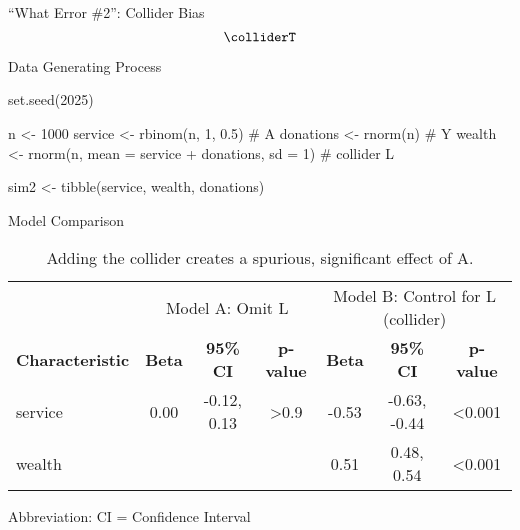 \documentclass[
  ignorenonframetext,
  aspectratio=169,
  xcolor=\{dvipsnames\}]{beamer}
\newenvironment{Shaded}{\begin{snugshade}}{\end{snugshade}}
\newcommand{\AttributeTok}[1]{\textcolor[rgb]{0.40,0.45,0.13}{#1}}
\newcommand{\CommentTok}[1]{\textcolor[rgb]{0.37,0.37,0.37}{#1}}
\newcommand{\DecValTok}[1]{\textcolor[rgb]{0.68,0.00,0.00}{#1}}
\newcommand{\FloatTok}[1]{\textcolor[rgb]{0.68,0.00,0.00}{#1}}
\newcommand{\FunctionTok}[1]{\textcolor[rgb]{0.28,0.35,0.67}{#1}}
\newcommand{\NormalTok}[1]{\textcolor[rgb]{0.00,0.23,0.31}{#1}}
\newcommand{\OtherTok}[1]{\textcolor[rgb]{0.00,0.23,0.31}{#1}}
\newcommand{\SpecialCharTok}[1]{\textcolor[rgb]{0.37,0.37,0.37}{#1}}
\begin{document}
\begin{frame}{``What Error \#2'': Collider Bias}
\label{what-error-2-collider-bias}
\[\colliderT\]
\end{frame}

\begin{frame}[fragile]{Data Generating Process}
\label{data-generating-process-1}
\begin{Shaded}
\begin{Highlighting}[]
\FunctionTok{set.seed}\NormalTok{(}\DecValTok{2025}\NormalTok{)}

\NormalTok{n          }\OtherTok{\textless{}{-}} \DecValTok{1000}
\NormalTok{service    }\OtherTok{\textless{}{-}} \FunctionTok{rbinom}\NormalTok{(n, }\DecValTok{1}\NormalTok{, }\FloatTok{0.5}\NormalTok{)                            }\CommentTok{\# A}
\NormalTok{donations  }\OtherTok{\textless{}{-}} \FunctionTok{rnorm}\NormalTok{(n)                                     }\CommentTok{\# Y}
\NormalTok{wealth     }\OtherTok{\textless{}{-}} \FunctionTok{rnorm}\NormalTok{(n, }\AttributeTok{mean =}\NormalTok{ service }\SpecialCharTok{+}\NormalTok{ donations, }\AttributeTok{sd =} \DecValTok{1}\NormalTok{) }\CommentTok{\# collider L}

\NormalTok{sim2 }\OtherTok{\textless{}{-}} \FunctionTok{tibble}\NormalTok{(service, wealth, donations)}
\end{Highlighting}
\end{Shaded}
\end{frame}

\begin{frame}{Model Comparison}
\label{model-comparison-1}
\begin{table}
\caption{Adding the collider creates a spurious, significant effect of A.}\tabularnewline

\fontsize{12.0pt}{14.4pt}\selectfont
\begin{tabular*}{\linewidth}{@{\extracolsep{\fill}}lcccccc}
\toprule
 & \multicolumn{3}{c}{Model A: Omit L} & \multicolumn{3}{c}{Model B: Control for L (collider)} \\ 
\cmidrule(lr){2-4} \cmidrule(lr){5-7}
\textbf{Characteristic} & \textbf{Beta} & \textbf{95\% CI} & \textbf{p-value} & \textbf{Beta} & \textbf{95\% CI} & \textbf{p-value} \\ 
\midrule\addlinespace[2.5pt]
service & 0.00 & -0.12, 0.13 & >0.9 & -0.53 & -0.63, -0.44 & <0.001 \\ 
wealth &  &  &  & 0.51 & 0.48, 0.54 & <0.001 \\ 
\bottomrule
\end{tabular*}
\begin{minipage}{\linewidth}
Abbreviation: CI = Confidence Interval\\
\end{minipage}
\end{table}
\end{frame}
\end{document}

